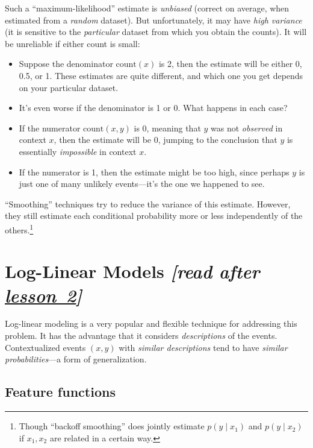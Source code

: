 \documentclass[11pt]{article}
\newcommand{\ph}{\hat{p}}
\newcommand{\lesson}[1]{\href{http://cs.jhu.edu/~jason/tutorials/loglin/\##1}{lesson~#1}}
\begin{document}
Such a ``maximum-likelihood'' estimate is {\em unbiased} (correct on
average, when estimated from a {\em random} dataset).  But unfortunately, it
may have {\em high variance} (it is sensitive to the {\em particular}
dataset from which you obtain the counts).  It will be unreliable if
either count is small:
\begin{itemize}[noitemsep]
\item Suppose the denominator $\textrm{count}(x)$ is 2, then the estimate
  will be either 0, 0.5, or 1.  These estimates are quite different,
  and which one you get depends on your particular dataset.
\item It's even worse if the denominator is 1 or 0.  What happens in
  each case?
\item If the numerator $\textrm{count}(x,y)$ is 0, meaning that $y$
  was not {\em observed} in context $x$, then the estimate will
  be 0, jumping to the conclusion that $y$ is essentially {\em impossible} in context $x$.
\item If the numerator is 1, then the estimate might be too high,
  since perhaps $y$ is just one of many unlikely events---it's the one
  we happened to see.
\end{itemize}

\noindent
``Smoothing'' techniques try to reduce the variance of this estimate.
However, they still estimate each conditional probability more or less
independently of the others.\footnote{Though ``backoff smoothing'' does jointly
  estimate $p(y \mid x_1)$ and $p(y \mid x_2)$ if $x_1, x_2$ are
  related in a certain way.}

\section{Log-Linear Models {\em [read after \lesson{2}]}}\label{sec:loglin}

Log-linear modeling is a very popular and flexible technique for
addressing this problem.  It has the advantage that it considers {\em
  descriptions} of the events.  Contextualized events $(x,y)$ with
{\em similar descriptions} tend to have {\em similar probabilities}---a form
of generalization.

\subsection{Feature functions}\label{sec:featfuncs}
\end{document}
